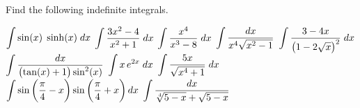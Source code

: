 
\ifcalculus\pagebreak\fi
\begin{Exercise} Find the following indefinite integrals.
	\begin{multicols}{2}
		\ifanalysis
			\Question[difficulty = 1] $\displaystyle \int \sin (x)\;\sinh (x)\;dx$
		\fi
		\Question[difficulty = 1] $\displaystyle \int \dfrac{3x^2-4}{x^2+1}\; dx$
		\Question[difficulty = 2] $\displaystyle \int \dfrac{x^4}{x^3-8}\; dx$
		\Question[difficulty = 2] $\displaystyle \int\dfrac{dx}{x^4\sqrt{x^2-1}}$
		\ifanalysis\Question[difficulty = 1]\fi\ifcalculus\Question[difficulty = 2]\fi $\displaystyle \int\dfrac{3-4x}{\left(1-2\sqrt{x}\right)^2}\;dx$
		\ifanalysis\Question[difficulty = 1]\fi\ifcalculus\Question[difficulty = 2]\fi $\displaystyle \int\dfrac{dx}{\left(\tan (x)+1\right)\sin^2 (x)}$
		\Question[difficulty = 1] $\displaystyle \int x\,e^{2x}\;dx$
		\ifanalysis\Question[difficulty = 1]\fi\ifcalculus\Question[difficulty = 2]\fi $\displaystyle \int\dfrac{5x}{\sqrt{x^4+1}}\;dx$
		\ifanalysis\Question[difficulty = 1]\fi\ifcalculus\Question[difficulty = 2]\fi $\displaystyle \int \sin\left(\dfrac{\pi}{4}-x\right)\sin\left(\dfrac{\pi}{4}+x\right) dx$
		\ifanalysis\Question[difficulty = 1]\fi\ifcalculus\Question[difficulty = 2]\fi $\displaystyle \int\dfrac{dx}{\sqrt[4]{5-x}+\sqrt{5-x}}$
		\EndCurrentQuestion
	\end{multicols}
\end{Exercise}

